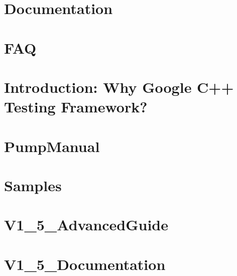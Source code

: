 \documentclass[twoside]{book}
\newcommand{\+}{\discretionary{\mbox{\scriptsize$\hookleftarrow$}}{}{}}
\begin{document}
\chapter{Documentation}
\label{md_vendor_googletest_googletest_docs__documentation}

\chapter{F\+AQ}
\label{md_vendor_googletest_googletest_docs__f_a_q}

\chapter{Introduction\+: Why Google C++ Testing Framework?}
\label{md_vendor_googletest_googletest_docs__primer}

\chapter{Pump\+Manual}
\label{md_vendor_googletest_googletest_docs__pump_manual}

\chapter{Samples}
\label{md_vendor_googletest_googletest_docs__samples}

\chapter{V1\+\_\+5\+\_\+\+Advanced\+Guide}
\label{md_vendor_googletest_googletest_docs__v1_5__advanced_guide}

\chapter{V1\+\_\+5\+\_\+\+Documentation}
\label{md_vendor_googletest_googletest_docs__v1_5__documentation}

\end{document}

